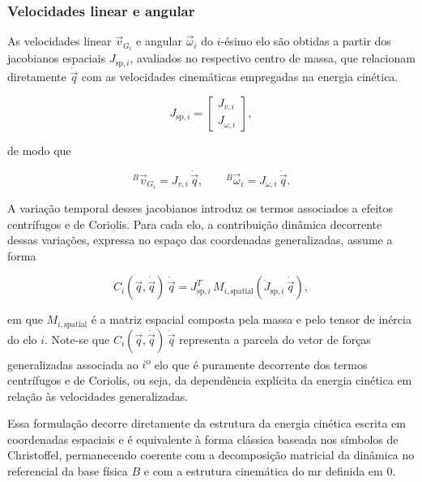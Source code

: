 
\subsubsection{Velocidades linear e angular}
\label{sec:dinAcoplada_veloc_linear_angular}

As velocidades linear $\vec v_{G_i}$ e angular $\vec\omega_i$ do $i$-ésimo elo são obtidas a partir dos jacobianos espaciais $J_{\text{sp},i}$, avaliados no respectivo centro de massa, que relacionam diretamente $\dot{\vec q}$ com as velocidades cinemáticas empregadas na energia cinética.

\begin{equation}
J_{\text{sp},i}=
\begin{bmatrix}
J_{v,i}\\[2pt]
J_{\omega,i}
\end{bmatrix},
\end{equation}

de modo que

\begin{equation}
{}^{B}\!\vec v_{G_i}=J_{v,i}\,\dot{\vec q},
\qquad
{}^{B}\!\vec\omega_i=J_{\omega,i}\,\dot{\vec q}.
\end{equation}

A variação temporal desses jacobianos introduz os termos associados a efeitos centrífugos e de Coriolis.
Para cada elo, a contribuição dinâmica decorrente dessas variações, expressa no espaço das coordenadas generalizadas, assume a forma

\begin{equation}
C_i(\vec q,\dot{\vec q})\,\dot{\vec q}
=
J_{\text{sp},i}^{T}\,
M_{i,\text{spatial}}
\left(
\dot J_{\text{sp},i}\,\dot{\vec q}
\right),
\end{equation}

em que $M_{i,\text{spatial}}$ é a matriz espacial composta pela massa e pelo tensor de inércia do elo $i$.
Note-se que $C_i(\vec q,\dot{\vec q})\,\dot{\vec q}$ representa a parcela do vetor de forças generalizadas associada ao $i$\textsuperscript{o} elo que é puramente decorrente dos termos centrífugos e de Coriolis, ou seja, da dependência explícita da energia cinética em relação às velocidades generalizadas.

Essa formulação decorre diretamente da estrutura da energia cinética escrita em coordenadas espaciais e é equivalente à forma clássica baseada nos símbolos de Christoffel, permanecendo coerente com a decomposição matricial da dinâmica no referencial da base física ${B}$ e com a estrutura cinemática do \gls{mr} definida em ${0}$.

